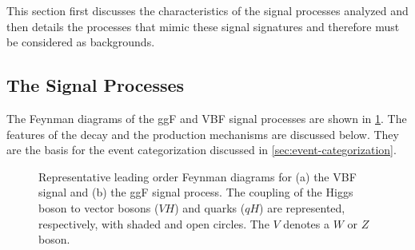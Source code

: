 This section first discusses the characteristics of the signal processes analyzed and then details the processes that mimic these signal signatures and therefore must be considered as backgrounds.

\subsection{The Signal Processes}
\label{subsec:signal-bkg-characterisation}
The Feynman diagrams of the ggF and VBF signal processes are shown in \cref{fig:feyn:sig-wwprod}.
The features of the \HWWdet decay and the production mechanisms are discussed below. They are the basis for the event categorization discussed in \cref{sec:event-categorization}. 

\begin{figure}[t]
    \caption{Representative leading order Feynman diagrams for (a) the VBF signal and (b) the ggF signal process. The coupling of the Higgs boson to vector bosons ($VH$) and quarks ($qH$) are represented, respectively, with shaded and open circles. The $V$ denotes a $W$ or $Z$ boson.} 
    \label{fig:feyn:sig-wwprod}
\end{figure}


